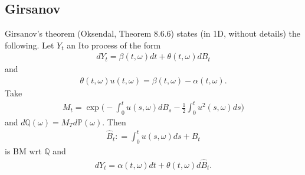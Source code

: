\documentclass[11pt]{amsart}
\begin{document}
\subsection{Girsanov}
Girsanov's theorem (Oksendal, Theorem 8.6.6) states (in 1D, without details)
the following. Let $Y_t$ an Ito process of the form
\begin{align*}
  dY_t = \beta(t,\omega)dt + \theta(t,\omega) dB_t
\end{align*} 
and 
\begin{align*}
  \theta(t,\omega) u(t,\omega) = \beta(t,\omega) - \alpha(t,\omega).
\end{align*}
Take
\begin{align*}
  M_t = \exp \bigg ( 
  - \int_0^t u(s,\omega) dB_s -\frac{1}{2} \int_0^t u^2(s,\omega) ds 
  \bigg )
\end{align*}
and $d\mathbb{Q}(\omega) = M_T d\mathbb{P}(\omega)$. Then 
\begin{align*}
  \hat{B}_t : = \int_0^t u(s,\omega) ds + B_t 
\end{align*}
is BM wrt $\mathbb{Q}$ and
\begin{align*}
  dY_t = \alpha(t,\omega) dt + \theta( t,\omega )d\hat{B}_t.
\end{align*}
\end{document}
